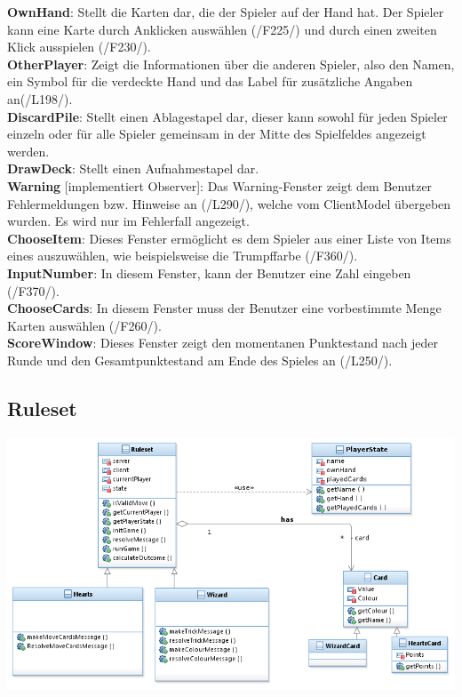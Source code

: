 \documentclass{article}
\begin{document}
\textbf{OwnHand}: Stellt die Karten dar, die der Spieler auf der Hand hat. Der Spieler kann eine Karte durch Anklicken auswählen (/F225/) und durch einen zweiten Klick ausspielen (/F230/).\\

\textbf{OtherPlayer}: Zeigt die Informationen über die anderen Spieler, also den Namen, ein Symbol für die verdeckte Hand und das Label für zusätzliche Angaben an(/L198/). \\

\textbf{DiscardPile}: Stellt einen Ablagestapel dar, dieser kann sowohl für jeden Spieler einzeln oder für alle Spieler gemeinsam in der Mitte des Spielfeldes angezeigt werden.\\

\textbf{DrawDeck}: Stellt einen Aufnahmestapel dar. \\

\textbf{Warning} [implementiert Observer]: Das Warning-Fenster zeigt dem Benutzer Fehlermeldungen bzw. Hinweise an (/L290/), welche vom ClientModel übergeben wurden. Es wird nur im Fehlerfall angezeigt. \\

\textbf{ChooseItem}: Dieses Fenster ermöglicht es dem Spieler aus einer Liste von Items eines auszuwählen, wie beispielsweise die Trumpffarbe (/F360/). \\

\textbf{InputNumber}: In diesem Fenster, kann der Benutzer eine Zahl eingeben (/F370/). \\

\textbf{ChooseCards}: In diesem Fenster muss der Benutzer eine vorbestimmte Menge Karten auswählen (/F260/). \\

\textbf{ScoreWindow}: Dieses Fenster zeigt den momentanen Punktestand nach jeder Runde und den Gesamtpunktestand am Ende des Spieles an (/L250/).\\


\subsection{Ruleset}
\includegraphics[width=\textwidth]{Ruleset}
\end{document}

